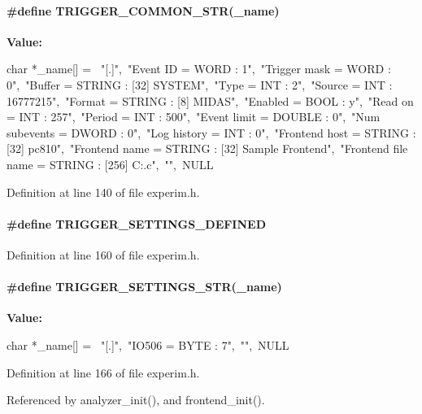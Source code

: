 \paragraph[{TRIGGER\_\-COMMON\_\-STR}]{\setlength{\rightskip}{0pt plus 5cm}\#define TRIGGER\_\-COMMON\_\-STR(\_\-name)}\hfill\label{experim_8h_aa9d6f27a46ec04dc00e9bfe0309cc27a}
{\bfseries Value:}
\begin{DoxyCode}
char *_name[] = {\
"[.]",\
"Event ID = WORD : 1",\
"Trigger mask = WORD : 0",\
"Buffer = STRING : [32] SYSTEM",\
"Type = INT : 2",\
"Source = INT : 16777215",\
"Format = STRING : [8] MIDAS",\
"Enabled = BOOL : y",\
"Read on = INT : 257",\
"Period = INT : 500",\
"Event limit = DOUBLE : 0",\
"Num subevents = DWORD : 0",\
"Log history = INT : 0",\
"Frontend host = STRING : [32] pc810",\
"Frontend name = STRING : [32] Sample Frontend",\
"Frontend file name = STRING : [256] C:\Midas\examples\experiment\frontend.c",\
"",\
NULL }
\end{DoxyCode}


Definition at line 140 of file experim.h.
\paragraph[{TRIGGER\_\-SETTINGS\_\-DEFINED}]{\setlength{\rightskip}{0pt plus 5cm}\#define TRIGGER\_\-SETTINGS\_\-DEFINED}\hfill\label{experim_8h_a9eae7c028c0d28d22a070549a5b8d9e9}


Definition at line 160 of file experim.h.
\paragraph[{TRIGGER\_\-SETTINGS\_\-STR}]{\setlength{\rightskip}{0pt plus 5cm}\#define TRIGGER\_\-SETTINGS\_\-STR(\_\-name)}\hfill\label{experim_8h_aba8c5b4adf8180aae43451def4ed3c0c}
{\bfseries Value:}
\begin{DoxyCode}
char *_name[] = {\
"[.]",\
"IO506 = BYTE : 7",\
"",\
NULL }
\end{DoxyCode}


Definition at line 166 of file experim.h.

Referenced by analyzer\_\-init(), and frontend\_\-init().